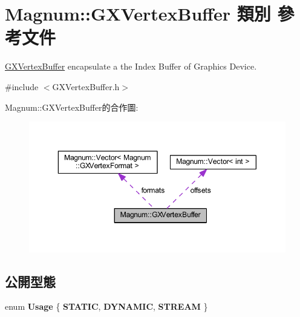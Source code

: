 \hypertarget{class_magnum_1_1_g_x_vertex_buffer}{}\section{Magnum\+:\+:G\+X\+Vertex\+Buffer 類別 參考文件}
\label{class_magnum_1_1_g_x_vertex_buffer}


\hyperlink{class_magnum_1_1_g_x_vertex_buffer}{G\+X\+Vertex\+Buffer} encapsulate a the Index Buffer of Graphics Device.  




{\ttfamily \#include $<$G\+X\+Vertex\+Buffer.\+h$>$}



Magnum\+:\+:G\+X\+Vertex\+Buffer的合作圖\+:\nopagebreak
\begin{figure}[H]
\begin{center}
\leavevmode
\includegraphics[width=350pt]{class_magnum_1_1_g_x_vertex_buffer__coll__graph}
\end{center}
\end{figure}
\subsection*{公開型態}
\begin{DoxyCompactItemize}
\item 
enum {\bfseries Usage} \{ {\bfseries S\+T\+A\+T\+IC}, 
{\bfseries D\+Y\+N\+A\+M\+IC}, 
{\bfseries S\+T\+R\+E\+AM}
 \}\hypertarget{class_magnum_1_1_g_x_vertex_buffer_a39169f473b0642ec90d9a7b5a60e92ee}{}\label{class_magnum_1_1_g_x_vertex_buffer_a39169f473b0642ec90d9a7b5a60e92ee}

\end{DoxyCompactItemize}
